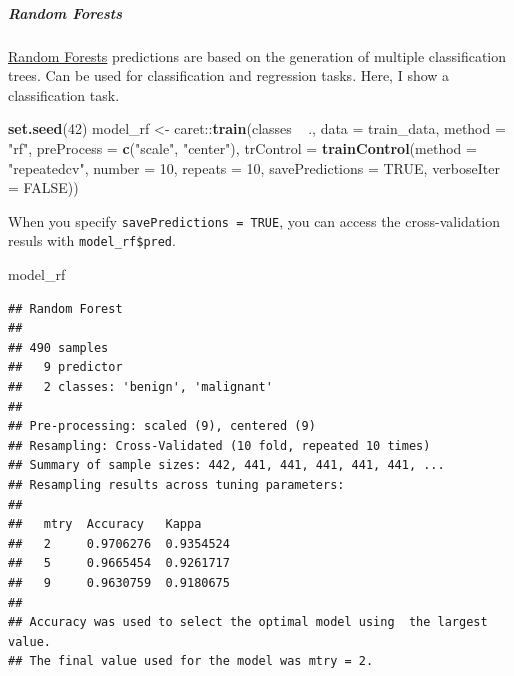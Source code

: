 \documentclass[]{article}
\newenvironment{Shaded}{\begin{snugshade}}{\end{snugshade}}
\newcommand{\KeywordTok}[1]{\textcolor[rgb]{0.13,0.29,0.53}{\textbf{{#1}}}}
\newcommand{\DataTypeTok}[1]{\textcolor[rgb]{0.13,0.29,0.53}{{#1}}}
\newcommand{\DecValTok}[1]{\textcolor[rgb]{0.00,0.00,0.81}{{#1}}}
\newcommand{\StringTok}[1]{\textcolor[rgb]{0.31,0.60,0.02}{{#1}}}
\newcommand{\OtherTok}[1]{\textcolor[rgb]{0.56,0.35,0.01}{{#1}}}
\newcommand{\NormalTok}[1]{{#1}}
\let\oldsubparagraph\subparagraph
\renewcommand{\subparagraph}[1]{\oldsubparagraph{#1}\mbox{}}
\begin{document}
\subparagraph{Random Forests}\label{random-forests}

\href{https://www.stat.berkeley.edu/~breiman/RandomForests/cc_home.htm}{Random
Forests} predictions are based on the generation of multiple
classification trees. Can be used for classification and regression
tasks. Here, I show a classification task.

\begin{Shaded}
\begin{Highlighting}[]
\KeywordTok{set.seed}\NormalTok{(}\DecValTok{42}\NormalTok{)}
\NormalTok{model_rf <-}\StringTok{ }\NormalTok{caret::}\KeywordTok{train}\NormalTok{(classes ~}\StringTok{ }\NormalTok{.,}
                         \DataTypeTok{data =} \NormalTok{train_data,}
                         \DataTypeTok{method =} \StringTok{"rf"}\NormalTok{,}
                         \DataTypeTok{preProcess =} \KeywordTok{c}\NormalTok{(}\StringTok{"scale"}\NormalTok{, }\StringTok{"center"}\NormalTok{),}
                         \DataTypeTok{trControl =} \KeywordTok{trainControl}\NormalTok{(}\DataTypeTok{method =} \StringTok{"repeatedcv"}\NormalTok{, }
                                                  \DataTypeTok{number =} \DecValTok{10}\NormalTok{, }
                                                  \DataTypeTok{repeats =} \DecValTok{10}\NormalTok{, }
                                                  \DataTypeTok{savePredictions =} \OtherTok{TRUE}\NormalTok{, }
                                                  \DataTypeTok{verboseIter =} \OtherTok{FALSE}\NormalTok{))}
\end{Highlighting}
\end{Shaded}

When you specify \texttt{savePredictions\ =\ TRUE}, you can access the
cross-validation resuls with \texttt{model\_rf\$pred}.

\begin{Shaded}
\begin{Highlighting}[]
\NormalTok{model_rf}
\end{Highlighting}
\end{Shaded}

\begin{verbatim}
## Random Forest 
## 
## 490 samples
##   9 predictor
##   2 classes: 'benign', 'malignant' 
## 
## Pre-processing: scaled (9), centered (9) 
## Resampling: Cross-Validated (10 fold, repeated 10 times) 
## Summary of sample sizes: 442, 441, 441, 441, 441, 441, ... 
## Resampling results across tuning parameters:
## 
##   mtry  Accuracy   Kappa    
##   2     0.9706276  0.9354524
##   5     0.9665454  0.9261717
##   9     0.9630759  0.9180675
## 
## Accuracy was used to select the optimal model using  the largest value.
## The final value used for the model was mtry = 2.
\end{verbatim}
\end{document}
